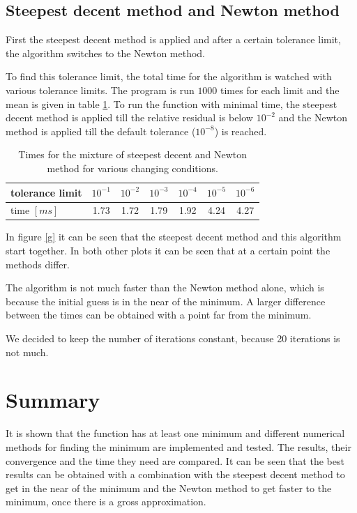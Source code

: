 \documentclass[a4paper,11pt]{article}
\begin{document}
\subsection{Steepest decent method and Newton method}
First the steepest decent method is applied and after a certain tolerance limit, the algorithm switches to the Newton method.

To find this tolerance limit, the total time for the algorithm is watched with various tolerance limits.
The program is run $1000$ times for each limit and the mean is given in table \ref{tab:steepestnewton}.
To run the function with minimal time, the steepest decent method is applied till the relative residual is below $10^{-2}$ and the Newton method is applied till the default tolerance ($10^{-8}$) is reached.
\begin{table}[h]
	\centering
	\begin{tabular}{l||c|c|c|c|c|c}
		tolerance limit & $10^{-1}$& $10^{-2}$&  $10^{-3}$& $10^{-4}$& $10^{-5}$& $10^{-6}$\\\hline
		time $[ms]$		& 1.73&1.72&1.79&1.92&4.24&4.27
	\end{tabular}
	\caption{Times for the mixture of steepest decent and Newton method for various changing conditions.} 
	\label{tab:steepestnewton}
\end{table}
In figure \ref{g} it can be seen that the steepest decent method and this algorithm start together. 
In both other plots it can be seen that at a certain point the methods differ.

The algorithm is not much faster than the Newton method alone, which is because the initial guess is in the near of the minimum.
A larger difference between the times can be obtained with a point far from the minimum.

We decided to keep the number of iterations constant, because 20 iterations is not much.

\section{Summary}
It is shown that the function has at least one minimum and different numerical methods for finding the minimum are implemented and tested.
The results, their convergence and the time they need are compared.
It can be  seen that the best results can be obtained with a combination with the steepest decent method to get in the near of the minimum and the Newton method to get faster to the minimum, once there is a gross approximation.
\end{document}
